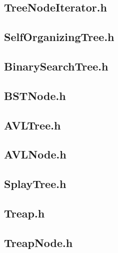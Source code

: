 \documentclass[a4paper,10pt]{article}
\begin{document}
\subsection{TreeNodeIterator.h}

\subsection{SelfOrganizingTree.h}

\subsection{BinarySearchTree.h}

\subsection{BSTNode.h}

\subsection{AVLTree.h}

\subsection{AVLNode.h}

\subsection{SplayTree.h}

\subsection{Treap.h}

\subsection{TreapNode.h}

\end{document}
